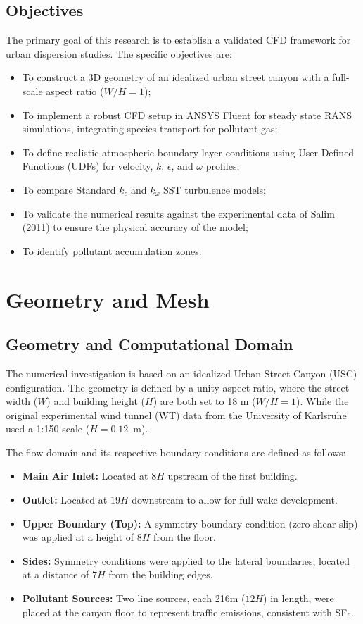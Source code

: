 \documentclass[11pt,a4paper]{report}
\begin{document}
\section{Objectives}
The primary goal of this research is to establish a validated CFD framework for urban dispersion studies. The specific objectives are:
\begin{itemize}
    \item To construct a 3D geometry of an idealized urban street canyon with a full-scale aspect ratio ($W/H = 1$);
    \item To implement a robust CFD setup in ANSYS Fluent for steady state RANS simulations, integrating species transport for pollutant gas;
    \item To define realistic atmospheric boundary layer conditions using User Defined Functions (UDFs) for velocity, $k$, $\epsilon$, and $\omega$ profiles;
    \item To compare  Standard $k_\epsilon$ and $k_\omega$ SST turbulence models;
    \item To validate the numerical results against the experimental data of Salim (2011) to ensure the physical accuracy of the model;
    \item To identify pollutant accumulation zones.
\end{itemize}

\chapter{Geometry and Mesh}

\section{Geometry and Computational Domain}

The numerical investigation is based on an idealized Urban Street Canyon (USC) configuration. The geometry is defined by a unity aspect ratio, where the street width ($W$) and building height ($H$) are both set to 18 m ($W/H = 1$). While the original experimental wind tunnel (WT) data from the University of Karlsruhe used a 1:150 scale ($H = 0.12$~m).

The flow domain and its respective boundary conditions are defined as follows:

\begin{itemize}
    \item \textbf{Main Air Inlet:} Located at $8H$ upstream of the first building.
    \item \textbf{Outlet:} Located at $19H$ downstream to allow for full wake development.
    \item \textbf{Upper Boundary (Top):} A symmetry boundary condition (zero shear slip) was applied at a height of $8H$ from the floor.
    \item \textbf{Sides:} Symmetry conditions were applied to the lateral boundaries, located at a distance of $7H$ from the building edges.
    \item \textbf{Pollutant Sources:} Two line sources, each 216m ($12H$) in length, were placed at the canyon floor to represent traffic emissions, consistent with SF$_6$.
\end{itemize}
\end{document}
